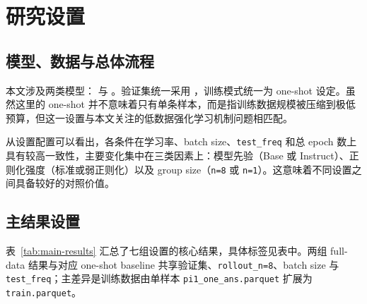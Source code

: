 \documentclass[12pt,a4paper]{ctexart}
\begin{document}
\section{研究设置}

\subsection{模型、数据与总体流程}

本文涉及两类模型：\ModelBase{} 与 \ModelInstruct{}。验证集统一采用 \EvalSet{}，训练模式统一为 one-shot 设定。虽然这里的 one-shot 并不意味着只有单条样本，而是指训练数据规模被压缩到极低预算，但这一设置与本文关注的低数据强化学习机制问题相匹配。

从设置配置可以看出，各条件在学习率、batch size、\texttt{test\_freq} 和总 epoch 数上具有较高一致性，主要变化集中在三类因素上：模型先验（Base 或 Instruct）、正则化强度（标准或弱正则化）以及 group size（\texttt{n=8} 或 \texttt{n=1}）。这意味着不同设置之间具备较好的对照价值。

\subsection{主结果设置}

表~\ref{tab:main-results} 汇总了七组设置的核心结果，具体标签见表中。两组 full-data 结果与对应 one-shot baseline 共享验证集、\texttt{rollout\_n=8}、batch size 与 \texttt{test\_freq}；主差异是训练数据由单样本 \texttt{pi1\_one\_ans.parquet} 扩展为 \texttt{train.parquet}。
\end{document}

